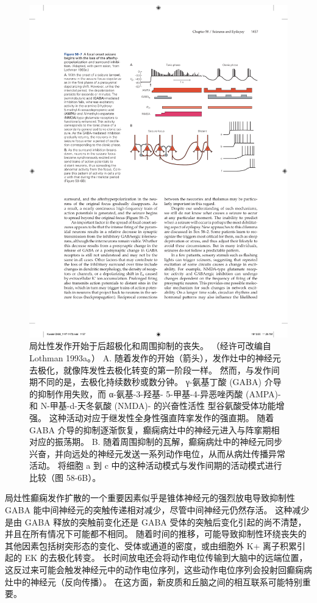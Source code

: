 \begin{figure}[htbp]
	\centering
	\includegraphics[width=0.7\linewidth]{chap58/fig_58_7}
	\caption{局灶性发作开始于后超极化和周围抑制的丧失。 （经许可改编自 Lothman 1993a。） A. 随着发作的开始（箭头），发作灶中的神经元去极化，就像阵发性去极化转变的第一阶段一样。 然而，与发作间期不同的是，去极化持续数秒或数分钟。 γ-氨基丁酸 (GABA) 介导的抑制作用失败，而 α-氨基-3-羟基- 5-甲基-4-异恶唑丙酸 (AMPA)- 和 N-甲基-d-天冬氨酸 (NMDA)- 的兴奋性活性 型谷氨酸受体功能增强。 这种活动对应于继发性全身性强直阵挛发作的强直期。 随着 GABA 介导的抑制逐渐恢复，癫痫病灶中的神经元进入与阵挛期相对应的振荡期。 B. 随着周围抑制的瓦解，癫痫病灶中的神经元同步兴奋，并向远处的神经元发送一系列动作电位，从而从病灶传播异常活动。 将细胞 a 到 c 中的这种活动模式与发作间期的活动模式进行比较（图 58-6B）。}
	\label{fig:58_7}
\end{figure}

局灶性癫痫发作扩散的一个重要因素似乎是锥体神经元的强烈放电导致抑制性 GABA 能中间神经元的突触传递相对减少，尽管中间神经元仍然存活。 这种减少是由 GABA 释放的突触前变化还是 GABA 受体的突触后变化引起的尚不清楚，并且在所有情况下可能都不相同。 随着时间的推移，可能导致抑制性环绕丧失的其他因素包括树突形态的变化、受体或通道的密度，或由细胞外 K+ 离子积累引起的 EK 的去极化转变。 长时间放电还会将动作电位传输到大脑中的远端位置，这反过来可能会触发神经元中的动作电位序列，这些动作电位序列会投射回癫痫病灶中的神经元（反向传播）。 在这方面，新皮质和丘脑之间的相互联系可能特别重要。

